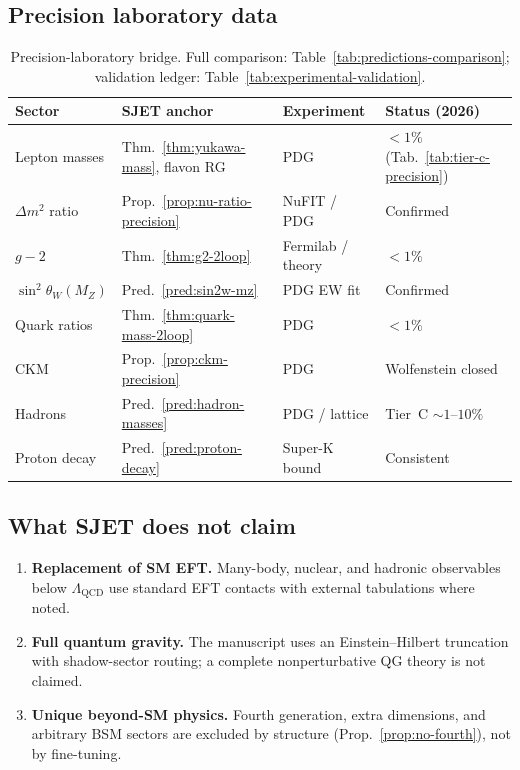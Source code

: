\subsection{Precision laboratory data}
\label{sec:standard-theories:lab}

\begin{table}[ht]
\centering
\small
\renewcommand{\arraystretch}{1.12}
\begin{tabular}{@{}llll@{}}
\toprule
\textbf{Sector} & \textbf{SJET anchor} & \textbf{Experiment} &
\textbf{Status (2026)} \\
\midrule
Lepton masses &
  Thm.~\ref{thm:yukawa-mass}, flavon RG &
  PDG &
  $<1\%$ (Tab.~\ref{tab:tier-c-precision}) \\
$\Delta m^2$ ratio &
  Prop.~\ref{prop:nu-ratio-precision} &
  NuFIT / PDG &
  Confirmed \\
$g-2$ &
  Thm.~\ref{thm:g2-2loop} &
  Fermilab / theory &
  $<1\%$ \\
$\sin^2\theta_W(M_Z)$ &
  Pred.~\ref{pred:sin2w-mz} &
  PDG EW fit &
  Confirmed \\
Quark ratios &
  Thm.~\ref{thm:quark-mass-2loop} &
  PDG &
  $<1\%$ \\
CKM &
  Prop.~\ref{prop:ckm-precision} &
  PDG &
  Wolfenstein closed \\
Hadrons &
  Pred.~\ref{pred:hadron-masses} &
  PDG / lattice &
  Tier~C $\sim 1$--$10\%$ \\
Proton decay &
  Pred.~\ref{pred:proton-decay} &
  Super-K bound &
  Consistent \\
\bottomrule
\end{tabular}
\caption{Precision-laboratory bridge. Full comparison:
Table~\ref{tab:predictions-comparison}; validation ledger:
Table~\ref{tab:experimental-validation}.}
\label{tab:lab-bridge}
\end{table}

\subsection{What SJET does not claim}
\label{sec:standard-theories:limits}

\begin{enumerate}[label=(\roman*),leftmargin=*]
  \item \textbf{Replacement of SM EFT.} Many-body, nuclear, and hadronic
    observables below $\Lambda_{\mathrm{QCD}}$ use standard EFT contacts with
    external tabulations where noted.
  \item \textbf{Full quantum gravity.} The manuscript uses an Einstein--Hilbert
    truncation with shadow-sector routing; a complete nonperturbative QG theory
    is not claimed.
  \item \textbf{Unique beyond-SM physics.} Fourth generation, extra dimensions,
    and arbitrary BSM sectors are excluded by structure (Prop.~\ref{prop:no-fourth}),
    not by fine-tuning.
\end{enumerate}

